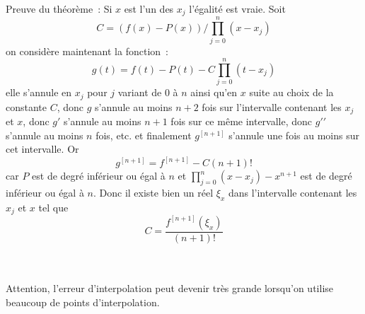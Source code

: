 \documentclass[a4paper,11pt]{article}
\begin{document}
\begin{giacjshere}
Preuve du th\'eor\`eme~: Si $x$ est l'un des $x_j$ l'égalité est vraie. Soit 
\[ C=(f(x)-P(x))/\prod_{j=0}^n(x-x_j) \]
on considère maintenant la fonction~:
\[ g(t)=f(t)-P(t) - C \prod_{j=0}^n(t-x_j) \]
elle s'annule en $x_j$ pour $j$ variant de 0 à $n$ ainsi qu'en $x$
suite au choix de la constante $C$, donc $g$ s'annule au moins $n+2$ fois
sur l'intervalle contenant les $x_j$ et $x$, donc $g'$ s'annule au moins
$n+1$ fois sur ce même intervalle, donc $g'{'}$ s'annule au moins
$n$ fois, etc. et finalement $g^{[n+1]}$ s'annule une fois
au moins sur cet intervalle. Or 
\[ g^{[n+1]} = f^{[n+1]} - C (n+1)!\]
car $P$ est de degré inférieur ou égal à $n$ 
et $ \prod_{j=0}^n(x-x_j) - x^{n+1}$ est de degré
inférieur ou égal à $n$. Donc il existe bien un réel $\xi_x$ dans
l'intervalle contenant les $x_j$ et $x$ tel que
\[ C=\frac{f^{[n+1]}(\xi_x)}{(n+1)!} \]
\\
\\


Attention, l'erreur d'interpolation peut devenir tr\`es grande
lorsqu'on utilise beaucoup de points d'interpolation.



\end{giacjshere}
\end{document}
